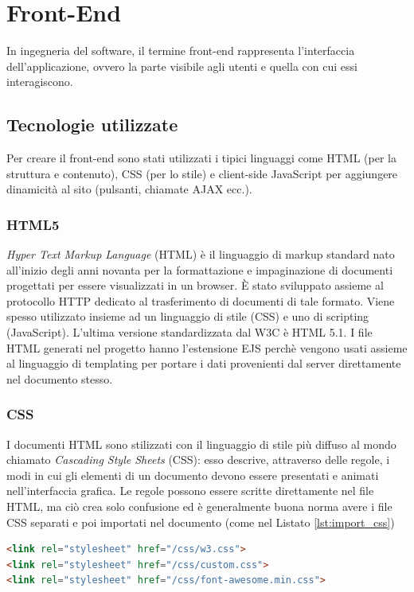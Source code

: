 \documentclass[12pt]{report}
\begin{document}
%
\section{Front-End}
%

In ingegneria del software, il termine front-end rappresenta l'interfaccia dell'applicazione, ovvero la parte visibile agli utenti e quella con cui essi interagiscono.

%
\subsection{Tecnologie utilizzate}
%

Per creare il front-end sono stati utilizzati i tipici linguaggi come HTML (per la struttura e contenuto), CSS (per lo stile) e client-side JavaScript per aggiungere dinamicità al sito (pulsanti, chiamate AJAX ecc.).

%
\subsubsection*{HTML5}
%
\emph{Hyper Text Markup Language} (HTML) è il linguaggio di markup standard nato all'inizio degli anni novanta per la formattazione e impaginazione di documenti progettati per essere visualizzati in un browser. È stato sviluppato assieme al protocollo HTTP dedicato al trasferimento di documenti di tale formato. Viene spesso utilizzato insieme ad un linguaggio di stile (CSS) e uno di scripting (JavaScript). L'ultima versione standardizzata dal W3C è HTML 5.1.
I file HTML generati nel progetto hanno l'estensione EJS perchè vengono usati assieme al linguaggio di templating per portare i dati provenienti dal server direttamente nel documento stesso.
%
\subsubsection*{CSS}
%
I documenti HTML sono stilizzati con il linguaggio di stile più diffuso al mondo chiamato \emph{Cascading Style Sheets} (CSS): esso descrive, attraverso delle regole, i modi in cui gli elementi di un documento devono essere presentati e animati nell'interfaccia grafica. Le regole possono essere scritte direttamente nel file HTML, ma ciò crea solo confusione ed è generalmente buona norma avere i file CSS separati e poi importati nel documento (come nel Listato \ref{lst:import_css})
\begin{lstlisting}[language=HTML, caption={Importazione dei file di stile nel documento HTML}, label={lst:import_css}]
<link rel="stylesheet" href="/css/w3.css">
<link rel="stylesheet" href="/css/custom.css">
<link rel="stylesheet" href="/css/font-awesome.min.css">
\end{lstlisting}
\end{document}
